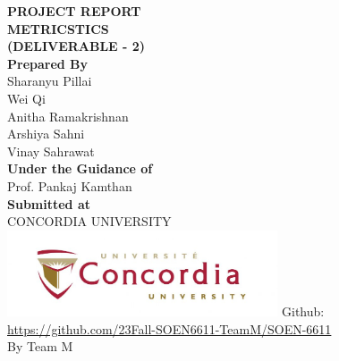 \documentclass[english,12pt,a4paper]{report}
\begin{document}
	\begin{titlepage}
		\centering
		\Huge
		\textbf{PROJECT REPORT}\\
		\vspace{1cm}
		\textbf{METRICSTICS}\\
		\textbf{(DELIVERABLE - 2)}\\
		\vspace{1.5cm}
		\Large
		\textbf{Prepared By}\\
		\vspace{0.5cm}
		Sharanyu Pillai\\
		Wei Qi\\
		Anitha Ramakrishnan\\
		Arshiya Sahni\\
		Vinay Sahrawat\\
		\vspace{1.5cm}
		\large
		\textbf{Under the Guidance of}\\
		Prof. Pankaj Kamthan \\
		\textbf{Submitted at}\\
		CONCORDIA UNIVERSITY\\
		\centering
		\includegraphics[width=8cm]{concordia.jpg}
		\vfill
		Github:\\
		\url{https://github.com/23Fall-SOEN6611-TeamM/SOEN-6611} \\
		By Team M
		\thispagestyle{empty} 
	\end{titlepage}
	
	\newpage 
	\setcounter{page}{0}
	\tableofcontents
	\clearpage
	

	
\end{document}
